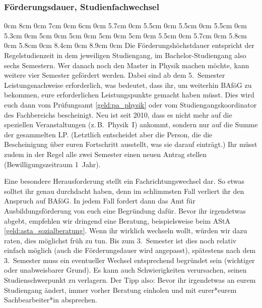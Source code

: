 \begin{multicols*}{2}
\subsubsection{Förderungsdauer, Studienfachwechsel}
0cm \columnwidth
0cm 8cm
0cm 7cm
0cm 6cm
0cm 5.7cm
0cm 5.5cm
0cm 5.5cm
0cm 5.5cm
0cm 5.3cm
0cm 5cm
0cm 5cm
0cm 5cm
0cm 5cm
0cm 5.5cm
0cm 5.7cm
0cm 5.8cm
0cm 5.8cm
0cm 8.4cm
0cm 8.9cm
0cm \columnwidth
0cm \columnwidth
0cm \columnwidth
0cm \columnwidth
0cm \columnwidth
0cm \columnwidth
Die Förderungshöchstdauer entspricht der Regelstudienzeit in dem jeweiligen Studiengang, im Bachelor-Studiengang also sechs Semestern.
Wer danach noch den Master in Physik machen möchte, kann weitere vier Semester gefördert werden.
Dabei sind ab dem 5.~Semester Leistungsnachweise erforderlich, was bedeutet, dass ihr, um weiterhin BAföG zu bekommen, eure erforderlichen Leistungspunkte gemacht haben müsst.
Dies wird euch dann vom Prüfungsamt \cref{geld:pa_physik} oder vom Studiengangskoordinator des Fachbereichs bescheinigt.
Neu ist seit 2010, dass es nicht mehr auf die speziellen Veranstaltungen (z.\,B.\ Physik~I) ankommt, sondern nur auf die Summe der gesammelten LP.
(Letztlich entscheidet aber die Person, die die Bescheinigung über euren Fortschritt ausstellt, was sie darauf einträgt.)
Ihr müsst zudem in der Regel alle zwei Semester einen neuen Antrag stellen (Bewilligungszeitraum 1~Jahr).

Eine besondere Herausforderung stellt ein Fachrichtungswechsel dar.
So etwas solltet ihr genau durchdacht haben, denn im schlimmsten Fall verliert ihr den Anspruch auf BAföG.
In jedem Fall fordert dann das Amt für Ausbildungsförderung von euch eine Begründung dafür.
Bevor ihr irgendetwas abgebt, empfehlen wir dringend eine Beratung, beispielsweise beim AStA \cref{geld:asta_sozialberatung}.
Wenn ihr wirklich wechseln wollt, würden wir dazu raten, dies möglichst früh zu tun.
Bis zum 3.~Semester ist dies noch relativ einfach möglich (auch die Förderungsdauer wird angepasst), spätestens nach dem 3.~Semester muss ein eventueller Wechsel entsprechend begründet sein (wichtiger oder unabweisbarer Grund).
Es kann auch Schwierigkeiten verursachen, seinen Studienschwerpunkt zu verlagern.
Der Tipp also:
Bevor ihr irgendetwas an eurem Studiengang ändert, immer vorher Beratung einholen und mit eurer*eurem Sachbearbeiter*in absprechen.


\end{multicols*}
